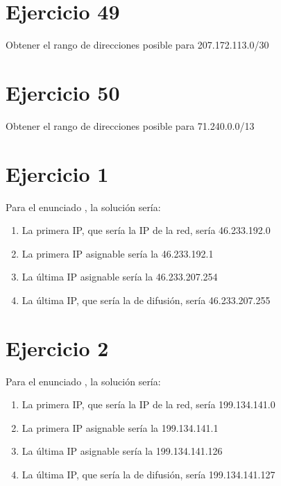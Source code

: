 \documentclass[letterpaper,10pt,spanish]{sphinxmanual}
\begin{document}
\section{Ejercicio 49}
\label{\detokenize{t2_integracion_elementos/ejercicios_subredes_ipv4/rangos_direcciones:ejercicio-49}}
\sphinxAtStartPar
Obtener el rango de direcciones posible para 207.172.113.0/30


\section{Ejercicio 50}
\label{\detokenize{t2_integracion_elementos/ejercicios_subredes_ipv4/rangos_direcciones:ejercicio-50}}
\sphinxAtStartPar
Obtener el rango de direcciones posible para 71.240.0.0/13


\section{Ejercicio 1}
\label{\detokenize{t2_integracion_elementos/ejercicios_subredes_ipv4/rangos_direcciones:id1}}
\sphinxAtStartPar
Para el enunciado , la solución sería:
\begin{enumerate}
%
\item {} 
\sphinxAtStartPar
La primera IP, que sería la IP de la red, sería 46.233.192.0

\item {} 
\sphinxAtStartPar
La primera IP asignable sería la 46.233.192.1

\item {} 
\sphinxAtStartPar
La última IP asignable sería la 46.233.207.254

\item {} 
\sphinxAtStartPar
La última IP, que sería la de difusión, sería 46.233.207.255

\end{enumerate}


\section{Ejercicio 2}
\label{\detokenize{t2_integracion_elementos/ejercicios_subredes_ipv4/rangos_direcciones:id2}}
\sphinxAtStartPar
Para el enunciado , la solución sería:
\begin{enumerate}
%
\item {} 
\sphinxAtStartPar
La primera IP, que sería la IP de la red, sería 199.134.141.0

\item {} 
\sphinxAtStartPar
La primera IP asignable sería la 199.134.141.1

\item {} 
\sphinxAtStartPar
La última IP asignable sería la 199.134.141.126

\item {} 
\sphinxAtStartPar
La última IP, que sería la de difusión, sería 199.134.141.127

\end{enumerate}
\end{document}

